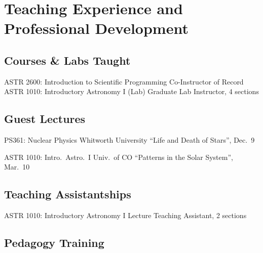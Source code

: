 \section{Teaching Experience and Professional Development}

\subsection{Courses \& Labs Taught}

		{ASTR 2600: Introduction to Scientific Programming}
		{Co-Instructor of Record}
		{}
		{}
        {}
        {ASTR 1010: Introductory Astronomy I (Lab)}
        {Graduate Lab Instructor, 4 sections}
        {}
        {}
        {}

\vspace{0.25cm}
\subsection{Guest Lectures}

        {PS361: Nuclear Physics}
        {Whitworth University}
        {``Life and Death of Stars'', Dec.~9}
        {}
        {}

        {ASTR 1010: Intro.~Astro.~I}
        {Univ.~of CO}
        {``Patterns in the Solar System'', Mar.~10}
        {}
        {}





\vspace{0.25cm}
\subsection{Teaching Assistantships}

        {ASTR 1010: Introductory Astronomy I}
        {Lecture Teaching Assistant, 2 sections}
        {}
        {}
        {}

\vspace{0.25cm}
\subsection{Pedagogy Training}

